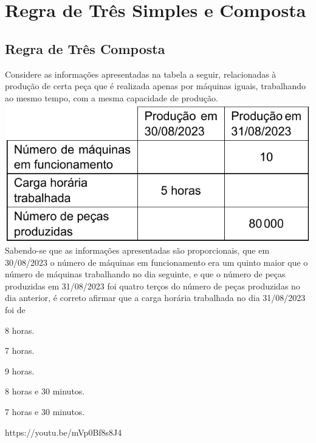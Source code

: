 \chapter{Regra de Três Simples e Composta}

\section{Regra de Três Composta}

{Considere as informações apresentadas na tabela a seguir, relacionadas à produção de certa peça que é
realizada apenas por máquinas iguais, trabalhando ao mesmo tempo, com a mesma capacidade de produção.\\
\includegraphics[scale=.5]{fig002.png}\\
Sabendo-se que as informações apresentadas são proporcionais, que em 30/08/2023 o número de máquinas
em funcionamento era um quinto maior que o número de máquinas trabalhando no dia seguinte, e que o número
de peças produzidas em 31/08/2023 foi quatro terços do número de peças produzidas no dia anterior, é correto afirmar que a carga horária trabalhada no dia 31/08/2023 foi de}
{\item 8 horas.
\item 7 horas.
\item 9 horas.
\item 8 horas e 30 minutos.
\item 7 horas e 30 minutos.}
{https://youtu.be/mVp0Bf8s8J4}


